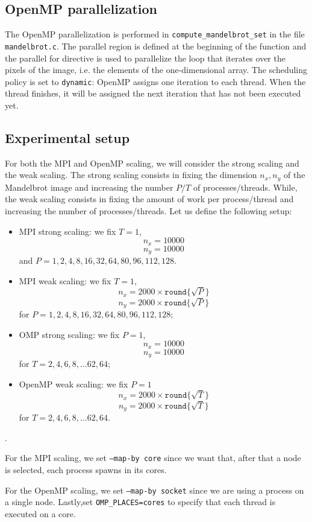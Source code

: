 \subsection{OpenMP parallelization}

The OpenMP parallelization is performed in \texttt{compute\_mandelbrot\_set} in the file \texttt{mandelbrot.c}. The parallel region is defined at the beginning of the function and the parallel for directive is used to parallelize the loop that iterates over the pixels of the image, i.e. the elements of the one-dimensional array. The scheduling policy is set to \texttt{dynamic}: OpenMP assigns one iteration to each thread. When the thread finishes, it will be assigned the next iteration that has not been executed yet.

\subsection{Experimental setup}

For both the MPI and OpenMP scaling, we will consider the strong scaling and the weak scaling. The strong scaling consists in fixing the dimension $n_x, n_y$ of the Mandelbrot image and increasing the number $P/T$ of processes/threads. While, the weak scaling consists in fixing the amount of work per process/thread and increasing the number of processes/threads.
Let us define the following setup:
\begin{itemize}
    \item MPI strong scaling: we fix $T=1$,
        $$n_x = 10000$$
        $$n_y = 10000$$
    and $P = 1, 2, 4, 8, 16, 32, 64, 80, 96, 112, 128$.
    \item MPI weak scaling: we fix $T=1$, 
        $$n_x = 2000 \times \texttt{round} \{\sqrt{P}\}$$
        $$n_y = 2000 \times \texttt{round}\{\sqrt{P}\}$$
    for $P = 1, 2, 4, 8, 16, 32, 64, 80, 96, 112, 128$;
    \item OMP strong scaling: we fix $P=1$,
        $$n_x = 10000$$
        $$n_y = 10000$$
    for $T = 2, 4, 6, 8, ... 62, 64$;
    \item OpenMP weak scaling: we fix $P=1$
        $$n_x = 2000 \times \texttt{round}\{\sqrt{T}\}$$
        $$n_y = 2000 \times \texttt{round}\{\sqrt{T}\}$$
    for $T = 2, 4, 6, 8, ... 62, 64$.
\end{itemize}.

For the MPI scaling, we set \texttt{--map-by core} since we want that, after that a node is selected, each process spawns in its cores.

For the OpenMP scaling, we set \texttt{--map-by socket} since we are using a process on a single node. Lastly,set \texttt{OMP\_PLACES=cores} to specify that each thread is executed on a core.